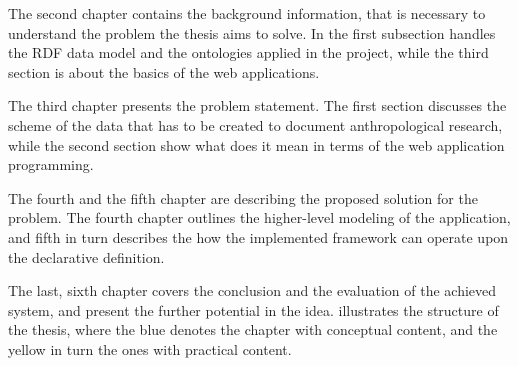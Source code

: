 The second chapter contains the background information, that is necessary to understand the problem the thesis aims to solve. In the first subsection handles the RDF data model and the ontologies applied in the project, while the third section is about the basics of the web applications.

The third chapter presents the problem statement. The first section discusses the scheme of the data that has to be created to document anthropological research, while the second section show what does it mean in terms of the web application programming. 

The fourth and the fifth chapter are describing the proposed solution for the problem. The fourth chapter outlines the higher-level modeling of the application, and fifth in turn describes the how the implemented framework can operate upon the declarative definition.

The last, sixth chapter covers the conclusion and the evaluation of the achieved system, and present the further potential in the idea.  illustrates the structure of the thesis, where the blue denotes the chapter with conceptual content, and the yellow in turn the ones with practical content.



